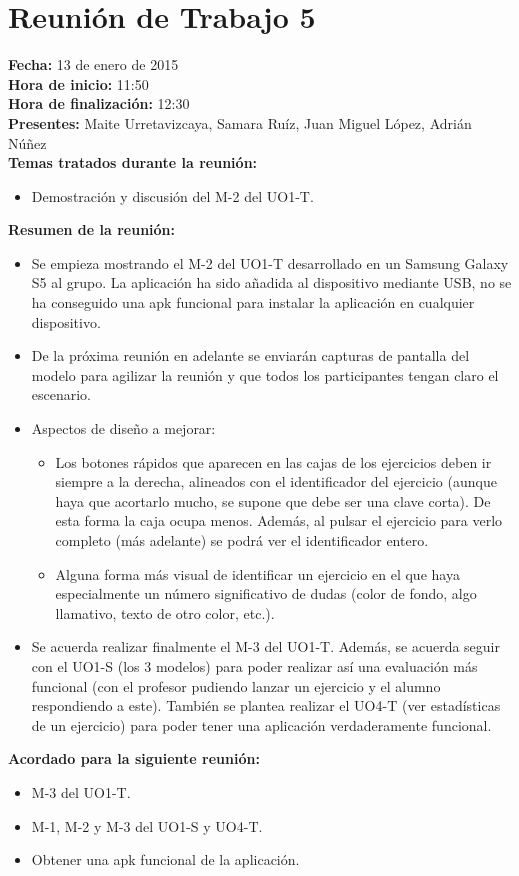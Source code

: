 \section*{Reunión de Trabajo 5}

\textbf{Fecha:} 13 de enero de 2015\\

\textbf{Hora de inicio:} 11:50\\

\textbf{Hora de finalización:} 12:30\\

\textbf{Presentes:} Maite Urretavizcaya, Samara Ruíz, Juan Miguel López, Adrián Núñez\\

\textbf{Temas tratados durante la reunión:}

\begin{itemize}
\item Demostración y discusión del M-2 del UO1-T.
\end{itemize}

\textbf{Resumen de la reunión:}

\begin{itemize}
\item Se empieza mostrando el M-2 del UO1-T desarrollado en un Samsung Galaxy S5 al grupo. La aplicación ha sido añadida al dispositivo mediante USB, no se ha conseguido una apk funcional para instalar la aplicación en cualquier dispositivo.

\item De la próxima reunión en adelante se enviarán capturas de pantalla del modelo para agilizar la reunión y que todos los participantes tengan claro el escenario.

\item Aspectos de diseño a mejorar:
	\begin{itemize}
	\item Los botones rápidos que aparecen en las cajas de los ejercicios deben ir siempre a la derecha, alineados con el 		identificador del ejercicio (aunque haya que acortarlo mucho, se supone que debe ser una clave corta). De esta forma 		la caja ocupa menos. Además, al pulsar el ejercicio para verlo completo (más adelante) se podrá ver el identificador 		entero.
	\item Alguna forma más visual de identificar un ejercicio en el que haya especialmente un número significativo de 			dudas (color de fondo, algo llamativo, texto de otro color, etc.).
	\end{itemize}

\item Se acuerda realizar finalmente el M-3 del UO1-T. Además, se acuerda seguir con el UO1-S (los 3 modelos) para poder realizar así una evaluación más funcional (con el profesor pudiendo lanzar un ejercicio y el alumno respondiendo a este). También se plantea realizar el UO4-T (ver estadísticas de un ejercicio) para poder tener una aplicación verdaderamente funcional.
\end{itemize}

\textbf{Acordado para la siguiente reunión:}

\begin{itemize}
\item M-3 del UO1-T.
\item M-1, M-2 y M-3 del UO1-S y UO4-T.
\item Obtener una apk funcional de la aplicación.
\end{itemize}